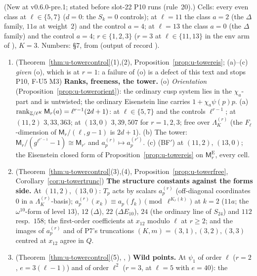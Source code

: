 \documentclass[11pt]{article}
\newcommand{\Iw}{\Lambda}                         %
\newcommand{\Eis}{\mathrm{E}}
\newcommand{\IwT}[2]{\Iw^{(#2)}_{#1}}                 %
\begin{document}
\begin{prediction}\label{pr:u-tower}
(New at v0.6.0-pre.1; stated before slot-22 P10 runs (rule~20).) Cells: every even class at $\ell\in\{5,7\}$ ($d=0$: the $S_k=0$ controls); at $\ell=11$ the class $a=2$ (the $\Delta$ family,
$11a$ at weight~$2$) and the control $a=4$; at $\ell=13$ the class $a=0$ (the $\Delta$ family) and the control $a=4$; $r\in\{1,2,3\}$ ($r=3$ at $\ell\in\{11,13\}$ in the env arm of
), $K=3$. Numbers:  \S7, from  (output of record ).
\begin{enumerate}
\item[(U18)] \PROVED{} (Theorem~\ref{thm:u-towercontrol}(1),(2), Proposition~\ref{prop:u-towereis}; (a)--(c) \emph{given} (o), which is \COMP{} at $r=1$: a failure of (o) is a defect of this text
  and stops P10, F-U5 M3) \textbf{Ranks, freeness, the tower.} (o) \emph{Orientation} (Proposition~\ref{prop:u-towerorient}): the
  ordinary cusp system lies in the $\chi_a$-part and is untwisted; the ordinary Eisenstein line carries $1+\chi_a\psi(p)p$. (a) $\operatorname{rank}_{\mathbb{Z}/\ell^{K}}\mathsf M_r(a)=\ell^{r-1}(2d+1)$: at $\ell\in\{5,7\}$ and the
  controls $\ell^{r-1}$; at $(11,2)$ $3,33,363$; at $(13,0)$ $3,39,507$ for $r=1,2,3$; free over $\IwT Kr$ (the $F_\ell$-dimension of $\mathsf M_r/(\ell,g-1)$ is $2d+1$). (b) The tower: $\mathsf M_r/(g^{\ell^{r'-1}}-1)\cong
  \mathsf M_{r'}$ and $a^{(r)}_p\mapsto a^{(r')}_p$. (c) (BF$'$) at $(11,2)$, $(13,0)$; the Eisenstein closed form of Proposition~\ref{prop:u-towereis} on $\mathsf M^{\Eis}_r$, every cell.
\item[(U19)] \PROVED{} (Theorem~\ref{thm:u-towercontrol}(3),(4), Proposition~\ref{prop:u-towerfree}, Corollary~\ref{cor:u-towertrunc}) \textbf{The structure constants against the forms side.} At $(11,2)$, $(13,0)$:
  $T_p$ acts by scalars $a^{(r)}_p$ (off-diagonal coordinates $0$ in a $\IwT Kr$-basis); $a^{(r)}_p(x_k)\equiv a_p(f_k)\pmod{\ell^{K_r(k)}}$ at $k=2$ ($11a$; the $\omega^{10}$-form of level $13$), $12$ ($\Delta$),
  $22$ ($\Delta E_{10}$), $24$ (the ordinary line of $S_{24}$) and $112$ resp.\ $158$; the first-order coefficients at $x_{12}$ modulo $\ell$ at $r\ge2$; and the images of $a^{(r)}_p$ and of P7's truncations
  $(K,m)=(3,1),(3,2),(3,3)$ centred at $x_{12}$ agree in $Q$.
\item[(U20)] \PROVED{} (Theorem~\ref{thm:u-towercontrol}(5), , ) \textbf{Wild points.} At $\psi_1$ of order $\ell$ ($r=2$, $e=3(\ell-1)$) and of order $\ell^{2}$ ($r=3$, at $\ell=5$ with $e=40$): the

\end{enumerate}
\end{prediction}
\end{document}
